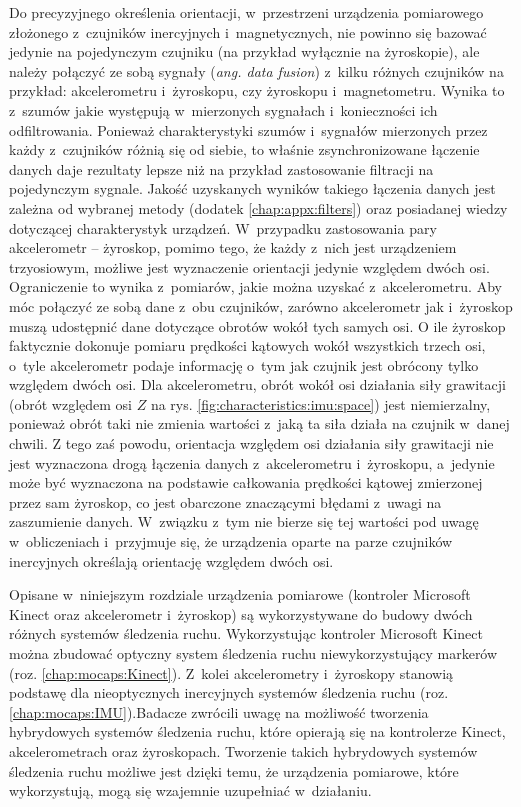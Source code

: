 Do precyzyjnego określenia orientacji, w~przestrzeni urządzenia pomiarowego złożonego z~czujników inercyjnych i~magnetycznych, nie powinno się bazować jedynie na pojedynczym czujniku (na przykład wyłącznie na żyroskopie), ale należy połączyć ze sobą sygnały (\emph{ang. data fusion}) z~kilku różnych czujników na przykład: akcelerometru i~żyroskopu, czy żyroskopu i~magnetometru. Wynika to z~szumów jakie występują w~mierzonych sygnałach i~konieczności ich odfiltrowania. Ponieważ charakterystyki szumów i~sygnałów mierzonych przez każdy z~czujników różnią się od siebie, to właśnie zsynchronizowane łączenie danych daje rezultaty lepsze niż na przykład zastosowanie filtracji na pojedynczym sygnale. Jakość uzyskanych wyników takiego łączenia danych jest zależna od wybranej metody (dodatek \ref{chap:appx:filters}) oraz posiadanej wiedzy dotyczącej charakterystyk urządzeń. W~przypadku zastosowania pary akcelerometr -- żyroskop, pomimo tego, że każdy z~nich jest urządzeniem trzyosiowym, możliwe jest wyznaczenie orientacji jedynie względem dwóch osi. Ograniczenie to wynika z~pomiarów, jakie można uzyskać z~akcelerometru. Aby móc połączyć ze sobą dane z~obu czujników, zarówno akcelerometr jak i~żyroskop muszą udostępnić dane dotyczące obrotów wokół tych samych osi. O ile żyroskop faktycznie dokonuje pomiaru prędkości kątowych wokół wszystkich trzech osi, o~tyle akcelerometr podaje informację o~tym jak czujnik jest obrócony tylko względem dwóch osi. Dla akcelerometru, obrót wokół osi działania siły grawitacji (obrót względem osi $Z$ na rys. \ref{fig:characteristics:imu:space}) jest niemierzalny, ponieważ obrót taki nie zmienia wartości z~jaką ta siła działa na czujnik w~danej chwili. Z tego zaś powodu, orientacja względem osi działania siły grawitacji nie jest wyznaczona drogą łączenia danych z~akcelerometru i~żyroskopu, a~jedynie może być wyznaczona na podstawie całkowania prędkości kątowej zmierzonej przez sam żyroskop, co jest obarczone znaczącymi błędami z~uwagi na zaszumienie danych. W~związku z~tym nie bierze się tej wartości pod uwagę w~obliczeniach i~przyjmuje się, że urządzenia oparte na parze czujników inercyjnych określają orientację względem dwóch osi.

Opisane w~niniejszym rozdziale urządzenia pomiarowe (kontroler Microsoft Kinect oraz akcelerometr i~żyroskop) są wykorzystywane do budowy dwóch różnych systemów śledzenia ruchu. Wykorzystując kontroler Microsoft Kinect można zbudować optyczny system śledzenia ruchu niewykorzystujący markerów (roz. \ref{chap:mocaps:Kinect}). Z~kolei akcelerometry i~żyroskopy stanowią podstawę dla nieoptycznych inercyjnych systemów śledzenia ruchu (roz. \ref{chap:mocaps:IMU}).Badacze zwrócili uwagę na możliwość tworzenia hybrydowych systemów śledzenia ruchu, które opierają się na kontrolerze Kinect, akcelerometrach oraz żyroskopach. Tworzenie takich hybrydowych systemów śledzenia ruchu możliwe jest dzięki temu, że urządzenia pomiarowe, które wykorzystują, mogą się wzajemnie uzupełniać w~działaniu.
											
